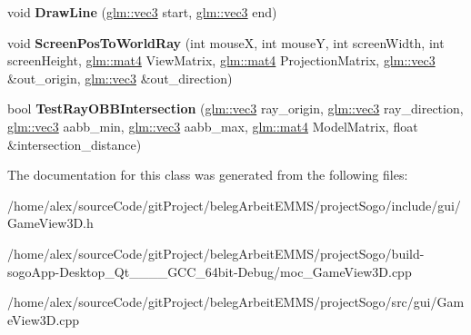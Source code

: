 \begin{DoxyCompactItemize}
\item 
\hypertarget{classGameView3D_a5e9b5ac73aaa4fedf3bbbec02544c184}{void {\bfseries Draw\-Line} (\hyperlink{group__core__types_gad45787527c6ff2bd6680867204eb0354}{glm\-::vec3} start, \hyperlink{group__core__types_gad45787527c6ff2bd6680867204eb0354}{glm\-::vec3} end)}\label{classGameView3D_a5e9b5ac73aaa4fedf3bbbec02544c184}

\item 
\hypertarget{classGameView3D_aa96228c70d0a93420abef7687518f809}{void {\bfseries Screen\-Pos\-To\-World\-Ray} (int mouse\-X, int mouse\-Y, int screen\-Width, int screen\-Height, \hyperlink{group__core__types_ga7dcd2365c2e368e6af5b7adeb6a9c8df}{glm\-::mat4} View\-Matrix, \hyperlink{group__core__types_ga7dcd2365c2e368e6af5b7adeb6a9c8df}{glm\-::mat4} Projection\-Matrix, \hyperlink{group__core__types_gad45787527c6ff2bd6680867204eb0354}{glm\-::vec3} \&out\-\_\-origin, \hyperlink{group__core__types_gad45787527c6ff2bd6680867204eb0354}{glm\-::vec3} \&out\-\_\-direction)}\label{classGameView3D_aa96228c70d0a93420abef7687518f809}

\item 
\hypertarget{classGameView3D_a301575899b1763b95a99e4c386f9356d}{bool {\bfseries Test\-Ray\-O\-B\-B\-Intersection} (\hyperlink{group__core__types_gad45787527c6ff2bd6680867204eb0354}{glm\-::vec3} ray\-\_\-origin, \hyperlink{group__core__types_gad45787527c6ff2bd6680867204eb0354}{glm\-::vec3} ray\-\_\-direction, \hyperlink{group__core__types_gad45787527c6ff2bd6680867204eb0354}{glm\-::vec3} aabb\-\_\-min, \hyperlink{group__core__types_gad45787527c6ff2bd6680867204eb0354}{glm\-::vec3} aabb\-\_\-max, \hyperlink{group__core__types_ga7dcd2365c2e368e6af5b7adeb6a9c8df}{glm\-::mat4} Model\-Matrix, float \&intersection\-\_\-distance)}\label{classGameView3D_a301575899b1763b95a99e4c386f9356d}

\end{DoxyCompactItemize}


The documentation for this class was generated from the following files\-:\begin{DoxyCompactItemize}
\item 
/home/alex/source\-Code/git\-Project/beleg\-Arbeit\-E\-M\-M\-S/project\-Sogo/include/gui/Game\-View3\-D.\-h\item 
/home/alex/source\-Code/git\-Project/beleg\-Arbeit\-E\-M\-M\-S/project\-Sogo/build-\/sogo\-App-\/\-Desktop\-\_\-\-Qt\-\_\-\_\-\_\-\_\-\-G\-C\-C\-\_\-64bit-\/\-Debug/moc\-\_\-\-Game\-View3\-D.\-cpp\item 
/home/alex/source\-Code/git\-Project/beleg\-Arbeit\-E\-M\-M\-S/project\-Sogo/src/gui/Game\-View3\-D.\-cpp\end{DoxyCompactItemize}
